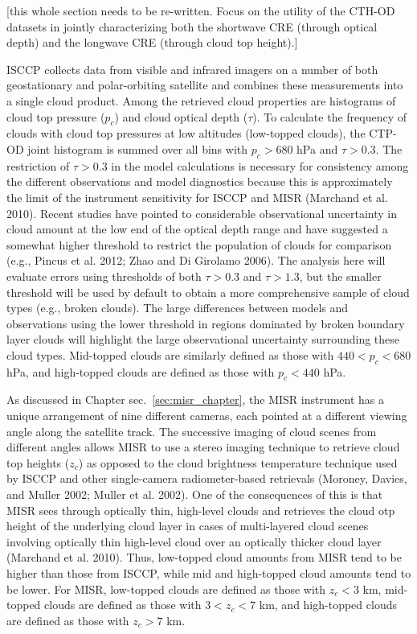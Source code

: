 {[}this whole section needs to be re-written. Focus on the utility of
the CTH-OD datasets in jointly characterizing both the shortwave CRE
(through optical depth) and the longwave CRE (through cloud top
height).{]}

ISCCP collects data from visible and infrared imagers on a number of
both geostationary and polar-orbiting satellite and combines these
measurements into a single cloud product. Among the retrieved cloud
properties are histograms of cloud top pressure (\(p_c\)) and cloud
optical depth (\(\tau\)). To calculate the frequency of clouds with
cloud top pressures at low altitudes (low-topped clouds), the CTP-OD
joint histogram is summed over all bins with \(p_c > 680\) hPa and
\(\tau > 0.3\). The restriction of \(\tau > 0.3\) in the model
calculations is necessary for consistency among the different
observations and model diagnostics because this is approximately the
limit of the instrument sensitivity for ISCCP and MISR (Marchand et al.
2010). Recent studies have pointed to considerable observational
uncertainty in cloud amount at the low end of the optical depth range
and have suggested a somewhat higher threshold to restrict the
population of clouds for comparison (e.g., Pincus et al. 2012; Zhao and
Di Girolamo 2006). The analysis here will evaluate errors using
thresholds of both \(\tau > 0.3\) and \(\tau > 1.3\), but the smaller
threshold will be used by default to obtain a more comprehensive sample
of cloud types (e.g., broken clouds). The large differences between
models and observations using the lower threshold in regions dominated
by broken boundary layer clouds will highlight the large observational
uncertainty surrounding these cloud types. Mid-topped clouds are
similarly defined as those with \(440 < p_c < 680\) hPa, and high-topped
clouds are defined as those with \(p_c < 440\) hPa.

As discussed in Chapter sec.~\ref{sec:misr_chapter}, the MISR instrument
has a unique arrangement of nine different cameras, each pointed at a
different viewing angle along the satellite track. The successive
imaging of cloud scenes from different angles allows MISR to use a
stereo imaging technique to retrieve cloud top heights (\(z_c\)) as
opposed to the cloud brightness temperature technique used by ISCCP and
other single-camera radiometer-based retrievals (Moroney, Davies, and
Muller 2002; Muller et al. 2002). One of the consequences of this is
that MISR sees through optically thin, high-level clouds and retrieves
the cloud otp height of the underlying cloud layer in cases of
multi-layered cloud scenes involving optically thin high-level cloud
over an optically thicker cloud layer (Marchand et al. 2010). Thus,
low-topped cloud amounts from MISR tend to be higher than those from
ISCCP, while mid and high-topped cloud amounts tend to be lower. For
MISR, low-topped clouds are defined as those with \(z_c < 3\) km,
mid-topped clouds are defined as those with \(3 < z_c < 7\) km, and
high-topped clouds are defined as those with \(z_c > 7\) km.

